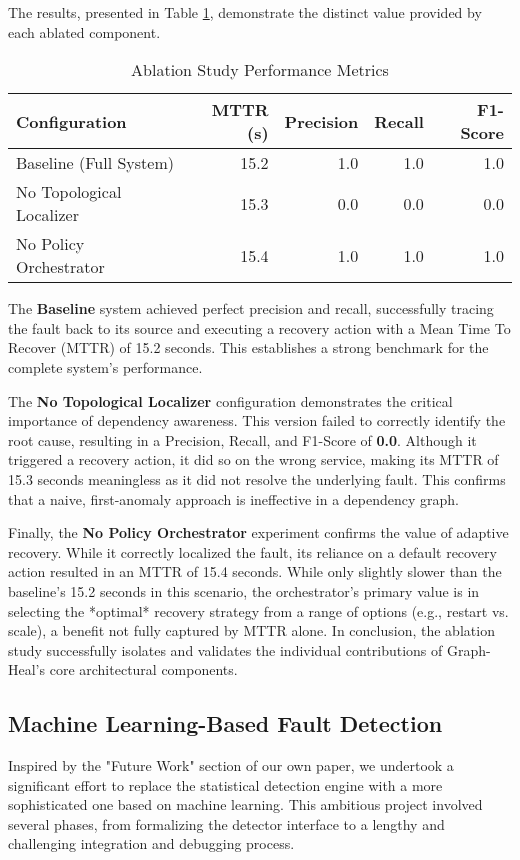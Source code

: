 \documentclass[11pt,conference]{IEEEtran}
\begin{document}
The results, presented in Table \ref{tab:ablation-results}, demonstrate the distinct value provided by each ablated component.

\begin{table}[ht]
  \centering
  \caption{Ablation Study Performance Metrics}
  \label{tab:ablation-results}
  \begin{tabular}{lrrrr}
    \hline
    \textbf{Configuration} & \textbf{MTTR (s)} & \textbf{Precision} & \textbf{Recall} & \textbf{F1-Score} \\
    \hline
    Baseline (Full System) & 15.2 & 1.0 & 1.0 & 1.0 \\
    No Topological Localizer & 15.3 & 0.0 & 0.0 & 0.0 \\
    No Policy Orchestrator & 15.4 & 1.0 & 1.0 & 1.0 \\
    \hline
  \end{tabular}
\end{table}

The \textbf{Baseline} system achieved perfect precision and recall, successfully tracing the fault back to its source and executing a recovery action with a Mean Time To Recover (MTTR) of 15.2 seconds. This establishes a strong benchmark for the complete system's performance.

The \textbf{No Topological Localizer} configuration demonstrates the critical importance of dependency awareness. This version failed to correctly identify the root cause, resulting in a Precision, Recall, and F1-Score of \textbf{0.0}. Although it triggered a recovery action, it did so on the wrong service, making its MTTR of 15.3 seconds meaningless as it did not resolve the underlying fault. This confirms that a naive, first-anomaly approach is ineffective in a dependency graph.

Finally, the \textbf{No Policy Orchestrator} experiment confirms the value of adaptive recovery. While it correctly localized the fault, its reliance on a default recovery action resulted in an MTTR of 15.4 seconds. While only slightly slower than the baseline's 15.2 seconds in this scenario, the orchestrator's primary value is in selecting the *optimal* recovery strategy from a range of options (e.g., restart vs. scale), a benefit not fully captured by MTTR alone. In conclusion, the ablation study successfully isolates and validates the individual contributions of Graph-Heal's core architectural components.



\subsection{Machine Learning-Based Fault Detection}
Inspired by the "Future Work" section of our own paper, we undertook a significant effort to replace the statistical detection engine with a more sophisticated one based on machine learning. This ambitious project involved several phases, from formalizing the detector interface to a lengthy and challenging integration and debugging process.
\end{document}
